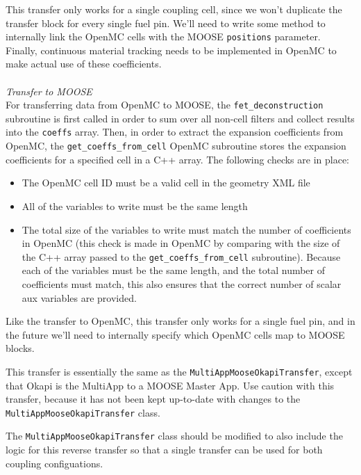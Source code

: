 \documentclass[10pt]{article}
\newcounter{subsubsubsection}[subsubsection]
\numberwithin{equation}{section} %
\begin{document}
\color{magenta}
This transfer only works for a single coupling cell, since we won't duplicate the transfer block for every single fuel pin. We'll need to write some method to internally link the OpenMC cells with the MOOSE {\tt positions} parameter. Finally, continuous material tracking needs to be implemented in OpenMC to make actual use of these coefficients.
\color{black}
\\\\
{\it Transfer to MOOSE}\\
For transferring data from OpenMC to MOOSE, the {\tt fet\_deconstruction} subroutine is first called in order to sum over all non-cell filters and collect results into the {\tt coeffs} array. Then, in order to extract the expansion coefficients from OpenMC, the {\tt get\_coeffs\_from\_cell} OpenMC subroutine stores the expansion coefficients for a specified cell in a C++ array. The following checks are in place:

\begin{itemize}
\item The OpenMC cell ID must be a valid cell in the geometry XML file
\item All of the variables to write must be the same length
\item The total size of the variables to write must match the number of coefficients in OpenMC (this check is made in OpenMC by comparing with the size of the C++ array passed to the {\tt get\_coeffs\_from\_cell} subroutine). Because each of the variables must be the same length, and the total number of coefficients must match, this also ensures that the correct number of scalar aux variables are provided.
\end{itemize}

\color{magenta}
Like the transfer to OpenMC, this transfer only works for a single fuel pin, and in the future we'll need to internally specify which OpenMC cells map to MOOSE blocks.
\color{black}

This transfer is essentially the same as the {\tt MultiAppMooseOkapiTransfer}, except that Okapi is the MultiApp to a MOOSE Master App. Use caution with this transfer, because it has not been kept up-to-date with changes to the {\tt MultiAppMooseOkapiTransfer} class.

\color{magenta}
The {\tt MultiAppMooseOkapiTransfer} class should be modified to also include the logic for this reverse transfer so that a single transfer can be used for both coupling configuations.
\color{black}
\end{document}
